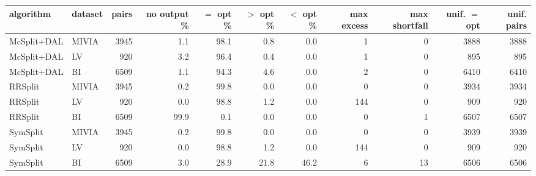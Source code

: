 \begin{tabular}{llrrrrrrrrr}
\toprule
algorithm & dataset & pairs & no output \% & $=$ opt \% & $>$ opt \% & $<$ opt \% & max excess & max shortfall & unif. $=$ opt & unif. pairs \\
\midrule
McSplit+DAL & MIVIA & 3945 & 1.1 & 98.1 & 0.8 & 0.0 & 1 & 0 & 3888 & 3888 \\
McSplit+DAL & LV & 920 & 3.2 & 96.4 & 0.4 & 0.0 & 1 & 0 & 895 & 895 \\
McSplit+DAL & BI & 6509 & 1.1 & 94.3 & 4.6 & 0.0 & 2 & 0 & 6410 & 6410 \\
RRSplit & MIVIA & 3945 & 0.2 & 99.8 & 0.0 & 0.0 & 0 & 0 & 3934 & 3934 \\
RRSplit & LV & 920 & 0.0 & 98.8 & 1.2 & 0.0 & 144 & 0 & 909 & 920 \\
RRSplit & BI & 6509 & 99.9 & 0.1 & 0.0 & 0.0 & 0 & 1 & 6507 & 6507 \\
SymSplit & MIVIA & 3945 & 0.2 & 99.8 & 0.0 & 0.0 & 0 & 0 & 3939 & 3939 \\
SymSplit & LV & 920 & 0.0 & 98.8 & 1.2 & 0.0 & 144 & 0 & 909 & 920 \\
SymSplit & BI & 6509 & 3.0 & 28.9 & 21.8 & 46.2 & 6 & 13 & 6506 & 6506 \\
\bottomrule
\end{tabular}
